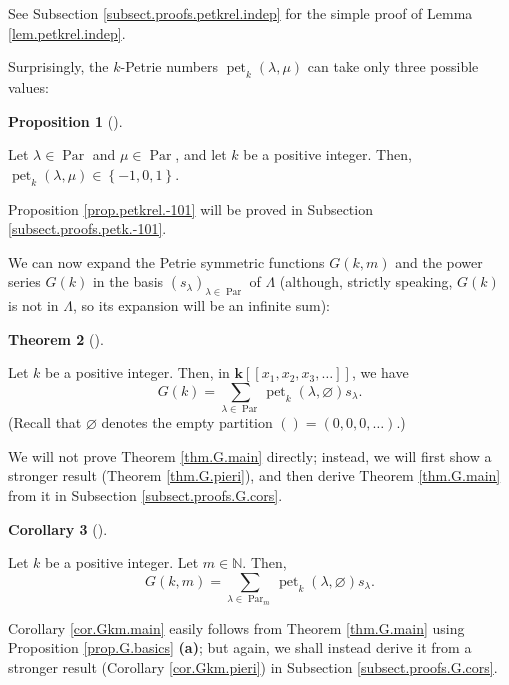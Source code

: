 \documentclass[numbers=enddot,12pt,final,onecolumn,notitlepage]{scrartcl}%
\theoremstyle{definition}
\newtheorem{theo}{Theorem}[section]
\newenvironment{theorem}[1][]
{\begin{theo}[#1]\begin{leftbar}}
{\end{leftbar}\end{theo}}
\newtheorem{prop}[theo]{Proposition}
\newenvironment{proposition}[1][]
{\begin{prop}[#1]\begin{leftbar}}
{\end{leftbar}\end{prop}}
\newtheorem{coro}[theo]{Corollary}
\newenvironment{corollary}[1][]
{\begin{coro}[#1]\begin{leftbar}}
{\end{leftbar}\end{coro}}
\let\sumnonlimits\sum
\renewcommand{\sum}{\sumnonlimits\limits}
\begin{document}
See Subsection \ref{subsect.proofs.petkrel.indep} for the simple proof of
Lemma \ref{lem.petkrel.indep}.

Surprisingly, the $k$-Petrie numbers $\operatorname*{pet}\nolimits_{k}\left(
\lambda,\mu\right)  $ can take only three possible values:

\begin{proposition}
\label{prop.petkrel.-101}Let $\lambda\in\operatorname*{Par}$ and $\mu
\in\operatorname*{Par}$, and let $k$ be a positive integer. Then,
$\operatorname*{pet}\nolimits_{k}\left(  \lambda,\mu\right)  \in\left\{
-1,0,1\right\}  $.
\end{proposition}

Proposition \ref{prop.petkrel.-101} will be proved in Subsection
\ref{subsect.proofs.petk.-101}.

We can now expand the Petrie symmetric functions $G\left(  k,m\right)  $ and
the power series $G\left(  k\right)  $ in the basis $\left(  s_{\lambda
}\right)  _{\lambda\in\operatorname*{Par}}$ of $\Lambda$ (although, strictly
speaking, $G\left(  k\right)  $ is not in $\Lambda$, so its expansion will be
an infinite sum):

\begin{theorem}
\label{thm.G.main}Let $k$ be a positive integer. Then, in $\mathbf{k}\left[
\left[  x_{1},x_{2},x_{3},\ldots\right]  \right]  $, we have%
\[
G\left(  k\right)  =\sum_{\lambda\in\operatorname*{Par}}\operatorname*{pet}%
\nolimits_{k}\left(  \lambda,\varnothing\right)  s_{\lambda}.
\]
(Recall that $\varnothing$ denotes the empty partition $\left(  {}\right)
=\left(  0,0,0,\ldots\right)  $.)
\end{theorem}

We will not prove Theorem \ref{thm.G.main} directly; instead, we will first
show a stronger result (Theorem \ref{thm.G.pieri}), and then derive Theorem
\ref{thm.G.main} from it in Subsection \ref{subsect.proofs.G.cors}.

\begin{corollary}
\label{cor.Gkm.main}Let $k$ be a positive integer. Let $m\in\mathbb{N}$. Then,%
\[
G\left(  k,m\right)  =\sum_{\lambda\in\operatorname*{Par}\nolimits_{m}%
}\operatorname*{pet}\nolimits_{k}\left(  \lambda,\varnothing\right)
s_{\lambda}.
\]

\end{corollary}

Corollary \ref{cor.Gkm.main} easily follows from Theorem \ref{thm.G.main}
using Proposition \ref{prop.G.basics} \textbf{(a)}; but again, we shall
instead derive it from a stronger result (Corollary \ref{cor.Gkm.pieri}) in
Subsection \ref{subsect.proofs.G.cors}.
\end{document}
